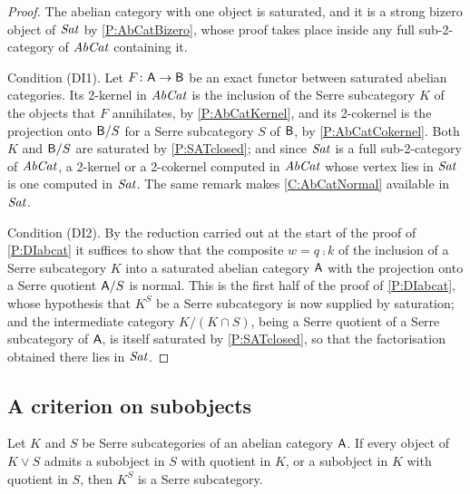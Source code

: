 \begin{proof}
  The abelian category with one object is saturated, and it is a strong bizero object of \(\mathit{Sat}\) by \prox\ref{P:AbCatBizero}, whose proof takes place inside any full sub-2-category of \(\mathit{AbCat}\) containing it.

	Condition \textup{(DI1)}. Let \(F\colon\mathsf{A}\to\mathsf{B}\) be an exact functor between saturated abelian categories. Its 2-kernel in \(\mathit{AbCat}\) is the inclusion of the Serre subcategory \(K\) of the objects that \(F\) annihilates, by \prox\ref{P:AbCatKernel}, and its 2-cokernel is the projection onto \(\mathsf{B}/S\) for a Serre subcategory \(S\) of \(\mathsf{B}\), by \prox\ref{P:AbCatCokernel}. Both \(K\) and \(\mathsf{B}/S\) are saturated by \prox\ref{P:SATclosed}; and since \(\mathit{Sat}\) is a full sub-2-category of \(\mathit{AbCat}\), a 2-kernel or a 2-cokernel computed in \(\mathit{AbCat}\) whose vertex lies in \(\mathit{Sat}\) is one computed in \(\mathit{Sat}\). The same remark makes \corx\ref{C:AbCatNormal} available in \(\mathit{Sat}\).

	Condition \textup{(DI2)}. By the reduction carried out at the start of the proof of \prox\ref{P:DIabcat} it suffices to show that the composite \(w=q\comp k\) of the inclusion of a Serre subcategory \(K\) into a saturated abelian category \(\mathsf{A}\) with the projection onto a Serre quotient \(\mathsf{A}/S\) is normal. This is the first half of the proof of \prox\ref{P:DIabcat}, whose hypothesis that \(K^{S}\) be a Serre subcategory is now supplied by saturation; and the intermediate category \(K/(K\cap S)\), being a Serre quotient of a Serre subcategory of \(\mathsf{A}\), is itself saturated by \prox\ref{P:SATclosed}, so that the factorisation obtained there lies in \(\mathit{Sat}\).
\end{proof}

\subsection{A criterion on subobjects}\label{SS:ModelAS}

\begin{proposition}
  \label{P:TwoStep}   \leanok
  Let \(K\) and \(S\) be Serre subcategories of an abelian category \(\mathsf{A}\). If every object of \(K\vee S\) admits a subobject in \(S\) with quotient in \(K\), or a subobject in \(K\) with quotient in \(S\), then \(K^{S}\) is a Serre subcategory.
\end{proposition}

